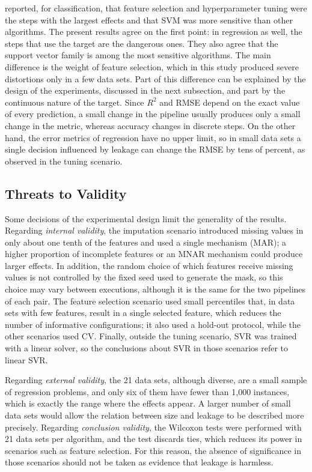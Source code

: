  reported, for classification, that feature selection and
hyperparameter tuning were the steps with the largest effects and that SVM was
more sensitive than other algorithms. The present results agree on the first
point: in regression as well, the steps that use the target are the dangerous
ones. They also agree that the support vector family is among the most sensitive
algorithms. The main difference is the weight of feature selection, which in
this study produced severe distortions only in a few data sets. Part of this
difference can be explained by the design of the experiments, discussed in the
next subsection, and part by the continuous nature of the target. Since $R^2$
and RMSE depend on the exact value of every prediction, a small change in the
pipeline usually produces only a small change in the metric, whereas accuracy
changes in discrete steps. On the other hand, the error metrics of regression
have no upper limit, so in small data sets a single decision influenced by
leakage can change the RMSE by tens of percent, as observed in the tuning
scenario.

\subsection{Threats to Validity}

Some decisions of the experimental design limit the generality of the results.
Regarding \emph{internal validity}, the imputation scenario introduced missing
values in only about one tenth of the features and used a single mechanism
(MAR); a higher proportion of incomplete features or an MNAR mechanism could
produce larger effects. In addition, the random choice of which features receive
missing values is not controlled by the fixed seed used to generate the mask, so
this choice may vary between executions, although it is the same for the two
pipelines of each pair. The feature selection scenario used small percentiles
that, in data sets with few features, result in a single selected feature, which
reduces the number of informative configurations; it also used a hold-out
protocol, while the other scenarios used CV. Finally, outside the tuning scenario,
SVR was trained with a linear solver, so the conclusions about SVR in those
scenarios refer to linear SVR.

Regarding \emph{external validity}, the 21 data sets, although diverse, are a
small sample of regression problems, and only six of them have fewer than 1,000
instances, which is exactly the range where the effects appear. A larger number
of small data sets would allow the relation between size and leakage to be
described more precisely. Regarding \emph{conclusion validity}, the Wilcoxon
tests were performed with 21 data sets per algorithm, and the test discards ties,
which reduces its power in scenarios such as feature selection. For this reason,
the absence of significance in those scenarios should not be taken as evidence
that leakage is harmless.
